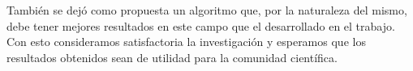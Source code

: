 \documentclass[a4paper,10pt,twocolumn]{article}
\begin{document}
Tambi\'en se dej\'o como propuesta un algoritmo que, por la naturaleza del mismo, debe 
tener mejores resultados en este campo que el desarrollado en el trabajo. Con esto consideramos satisfactoria la investigaci\'on y esperamos
que los resultados obtenidos sean de utilidad para la comunidad cient\'ifica.






\begin{thebibliography}{99}
	\bibitem{}

\end{thebibliography}


\label{end}
\end{document}
